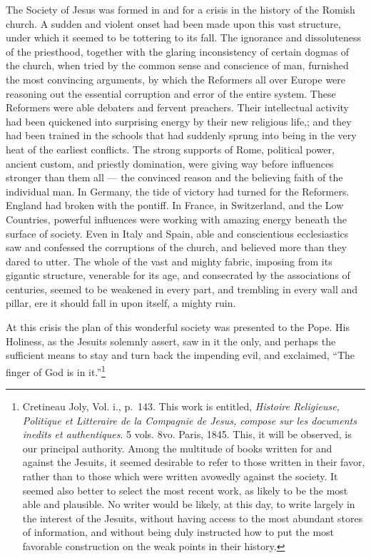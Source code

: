 \documentclass[]{book}
\let\rmarkdownfootnote\footnote%
\def\footnote{\protect\rmarkdownfootnote}
\begin{document}
The Society of Jesus was formed in and for a crisis in the history of the Romish church. A sudden and violent onset had been made upon this vast structure, under which it seemed to be tottering to its fall. The ignorance and dissoluteness of the priesthood, together with the glaring inconsistency of certain dogmas of the church, when tried by the common sense and conscience of man, furnished the most convincing arguments, by which the Reformers all over Europe were reasoning out the essential corruption and error of the entire system. These Reformers were able debaters and fervent preachers. Their intellectual activity had been quickened into surprising energy by their new religious life,; and they had been trained in the schools that had suddenly sprung into being in the very heat of the earliest conflicts. The strong supports of Rome, political power, ancient custom, and priestly domination, were giving way before influences stronger than them all --- the convinced reason and the believing faith of the individual man. In Germany, the tide of victory had turned for the Reformers. England had broken with the pontiff. In France, in Switzerland, and the Low Countries, powerful influences were working with amazing energy beneath the surface of society. Even in Italy and Spain, able and conscientious ecclesiastics saw and confessed the corruptions of the church, and believed more than they dared to utter. The whole of the vast and mighty fabric, imposing from its gigantic structure, venerable for its age, and consecrated by the associations of centuries, seemed to be weakened in every part, and trembling in every wall and pillar, ere it should fall in upon itself, a mighty ruin.

At this crisis the plan of this wonderful society was presented to the Pope. His Holiness, as the Jesuits solemnly assert, saw in it the only, and perhaps the sufficient means to stay and turn back the impending evil, and exclaimed, ``The finger of God is in it.''\footnote{Cretineau Joly, Vol. i., p.~143. This work is entitled, \emph{Histoire Religieuse, Politique et Litteraire de la Compagnie de Jesus, compose sur les documents inedits et authentiques}. 5 vols. 8vo. Paris, 1845. This, it will be observed, is our principal authority. Among the multitude of books written for and against the Jesuits, it seemed desirable to refer to those written in their favor, rather than to those which were written avowedly against the society. It seemed also better to select the most recent work, as likely to be the most able and plausible. No writer would be likely, at this day, to write largely in the interest of the Jesuits, without having access to the most abundant stores of information, and without being duly instructed how to put the most favorable construction on the weak points in their history.}
\end{document}
